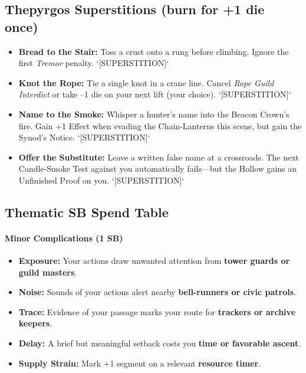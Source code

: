 \subsection*{Thepyrgos Superstitions (burn for +1 die once)}
\begin{itemize}
  \item \textbf{Bread to the Stair:} Toss a crust onto a rung before climbing. Ignore the first \emph{Tremor} penalty. `[SUPERSTITION]`
  \item \textbf{Knot the Rope:} Tie a single knot in a crane line. Cancel \emph{Rope Guild Interdict} or take --1 die on your next lift (your choice). `[SUPERSTITION]`
  \item \textbf{Name to the Smoke:} Whisper a hunter's name into the Beacon Crown's fire. Gain +1 Effect when evading the Chain-Lanterns this scene, but gain the Synod's Notice. `[SUPERSTITION]`
  \item \textbf{Offer the Substitute:} Leave a written false name at a crossroads. The next Candle-Smoke Test against you automatically fails---but the Hollow gains an Unfinished Proof on you. `[SUPERSTITION]`
\end{itemize}

\subsection*{Thematic SB Spend Table}
\label{sec:thepyrgos-sb}

\paragraph{Minor Complications (1 SB)}
\begin{itemize}
\item \textbf{Exposure:} Your actions draw unwanted attention from \textbf{tower guards or guild masters}.
\item \textbf{Noise:} Sounds of your actions alert nearby \textbf{bell-runners or civic patrols}.
\item \textbf{Trace:} Evidence of your passage marks your route for \textbf{trackers or archive keepers}.
\item \textbf{Delay:} A brief but meaningful setback costs you \textbf{time or favorable ascent}.
\item \textbf{Supply Strain:} Mark +1 segment on a relevant \textbf{resource timer}.
\end{itemize}

